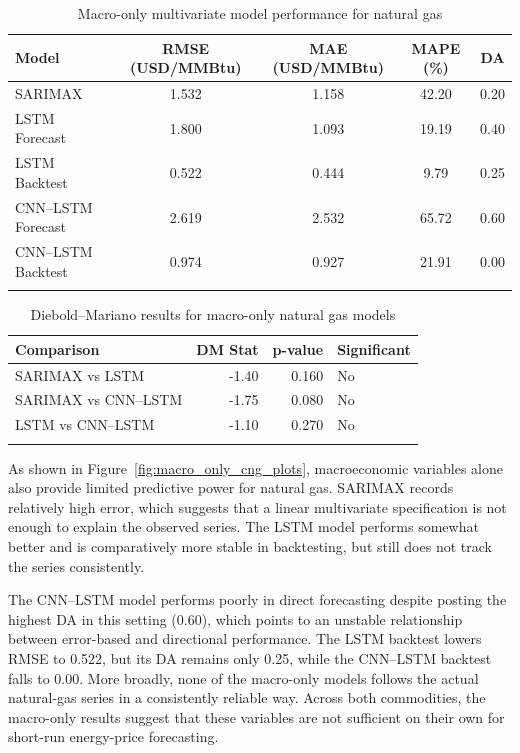 \documentclass[pdflatex,sn-mathphys-num]{sn-jnl}%
\theoremstyle{thmstyleone}%
\theoremstyle{thmstyletwo}%
\theoremstyle{thmstylethree}%
\begin{document}
\begin{table}[h]
\centering
\caption{Macro-only multivariate model performance for natural gas}
\label{tab:macro_only_cng}
\begin{tabular}{@{}lcccc@{}}
\toprule
Model & RMSE (USD/MMBtu) & MAE (USD/MMBtu) & MAPE (\%) & DA \\
\midrule
SARIMAX & 1.532 & 1.158 & 42.20 & 0.20 \\
LSTM Forecast & 1.800 & 1.093 & 19.19 & 0.40 \\
LSTM Backtest & 0.522 & 0.444 & 9.79 & 0.25 \\
CNN--LSTM Forecast & 2.619 & 2.532 & 65.72 & 0.60 \\
CNN--LSTM Backtest & 0.974 & 0.927 & 21.91 & 0.00 \\
\botrule
\end{tabular}
\end{table}

\begin{table}[h]
\centering
\small
\caption{Diebold--Mariano results for macro-only natural gas models}
\label{tab:dm_macro_cng}
\begin{tabular}{@{}lrrl@{}}
\toprule
Comparison & DM Stat & p-value & Significant \\
\midrule
SARIMAX vs LSTM & -1.40 & 0.160 & No \\
SARIMAX vs CNN--LSTM & -1.75 & 0.080 & No \\
LSTM vs CNN--LSTM & -1.10 & 0.270 & No \\
\botrule
\end{tabular}
\end{table}

As shown in Figure~\ref{fig:macro_only_cng_plots}, macroeconomic variables alone also provide limited predictive power for natural gas. SARIMAX records relatively high error, which suggests that a linear multivariate specification is not enough to explain the observed series. The LSTM model performs somewhat better and is comparatively more stable in backtesting, but still does not track the series consistently.

The CNN--LSTM model performs poorly in direct forecasting despite posting the highest DA in this setting (0.60), which points to an unstable relationship between error-based and directional performance. The LSTM backtest lowers RMSE to 0.522, but its DA remains only 0.25, while the CNN--LSTM backtest falls to 0.00. More broadly, none of the macro-only models follows the actual natural-gas series in a consistently reliable way. Across both commodities, the macro-only results suggest that these variables are not sufficient on their own for short-run energy-price forecasting.
\end{document}

